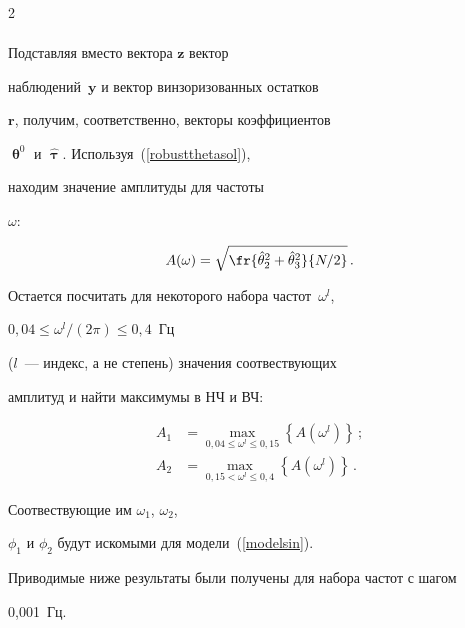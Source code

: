 \begin{multicols}{2}
\begin{align*}
\end{align*}


Подставляя вместо вектора $\mathbf{z}$ вектор


наблюдений~$\mathbf{y}$ и вектор винзоризованных остатков


$\mathbf{r}$, получим, соответственно, векторы коэффициентов


$\bm{\uptheta}^0$ и $\hat{\bm{\uptau}}$. Используя~(\ref{robustthetasol}),


находим значение амплитуды для частоты


$\omega$:


\begin{equation*}




A(\omega) =


\sqrt{\fr{\hat{\theta}_2^2+\hat{\theta}_3^2}{N/2}}\,.


\end{equation*}


Остается посчитать для некоторого набора час\-тот~$\omega^l$, 


$0{,}04 \leq \omega^l/(2\pi) \leq 0{,}4$~Гц 


($l$~--- индекс, а не степень) значения соотвествующих


амплитуд и найти максимумы в НЧ и ВЧ:


\begin{align*}


A_1 &=


\max_{0{,}04\leq\omega^l\leq 0{,}15}\left\{A(\omega^l) \right\}\,;\\




A_2 &= \max_{0{,}15<\omega^l\leq 0{,}4}\left\{A(\omega^l)


\right\}\,.


\end{align*}


Соотвествующие им $\omega_1$, $\omega_2$,


$\phi_1$ и $\phi_2$ будут искомыми для модели~(\ref{modelsin}).


Приводимые ниже результаты были получены для набора частот с шагом


0,001~Гц.





  \begin{figure} %



\end{figure}
\end{multicols}
